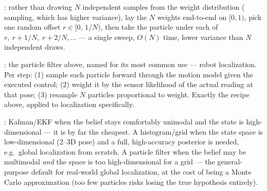 \begin{notebox}
: rather than drawing $N$ independent samples from the weight distribution ( sampling, which has higher variance), lay the $N$ weights end-to-end on $[0,1)$, pick one random offset $r\in[0,\,1/N)$, then take the particle under each of $r,\ r{+}1/N,\ r{+}2/N,\dots$ --- a single sweep, $O(N)$ time, lower variance than $N$ independent draws.

: the particle filter above, named for its most common use --- robot localization. Per step: (1) sample each particle forward through the motion model given the executed control; (2) weight it by the sensor likelihood of the actual reading at that pose; (3) resample $N$ particles proportional to weight. Exactly the recipe above, applied to localization specifically.
\end{notebox}
\begin{notebox}
: Kalman/EKF when the belief stays comfortably unimodal and the state is high-dimensional --- it is by far the cheapest. A histogram/grid when the state space is low-dimensional (2--3D pose) and a full, high-accuracy posterior is needed, e.g.\ global localization from scratch. A particle filter when the belief may be multimodal \emph{and} the space is too high-dimensional for a grid --- the general-purpose default for real-world global localization, at the cost of being a Monte Carlo approximation (too few particles risks losing the true hypothesis entirely).
\end{notebox}


